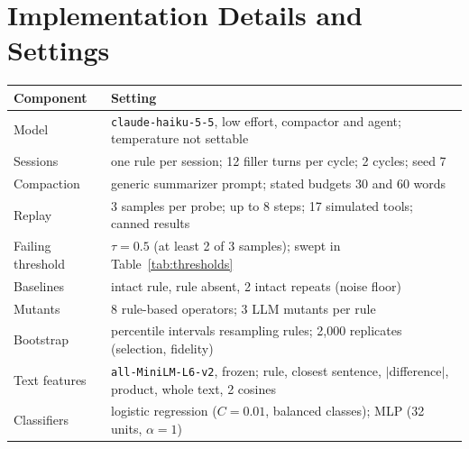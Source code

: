 \documentclass[10pt]{article}
\theoremstyle{definition}
\begin{document}
\section{Implementation Details and Settings}
\begin{center}\small
\begin{tabular}{@{}lp{}@{}}
\toprule
Component & Setting \\
\midrule
Model & \texttt{claude-haiku-5-5}, low effort, compactor and agent; temperature not settable \\
Sessions & one rule per session; 12 filler turns per cycle; 2 cycles; seed 7 \\
Compaction & generic summarizer prompt; stated budgets 30 and 60 words \\
Replay & 3 samples per probe; up to 8 steps; 17 simulated tools; canned results \\
Failing threshold & $\tau=0.5$ (at least 2 of 3 samples); swept in Table~\ref{tab:thresholds} \\
Baselines & intact rule, rule absent, 2 intact repeats (noise floor) \\
Mutants & 8 rule-based operators; 3 LLM mutants per rule \\
Bootstrap & percentile intervals resampling rules; 2{,}000 replicates (selection, fidelity) \\
Text features & \texttt{all-MiniLM-L6-v2}, frozen; rule, closest sentence, $|$difference$|$, product, whole text, 2 cosines \\
Classifiers & logistic regression ($C=0.01$, balanced classes); MLP (32 units, $\alpha=1$) \\
\bottomrule
\end{tabular}
\end{center}
\end{document}
